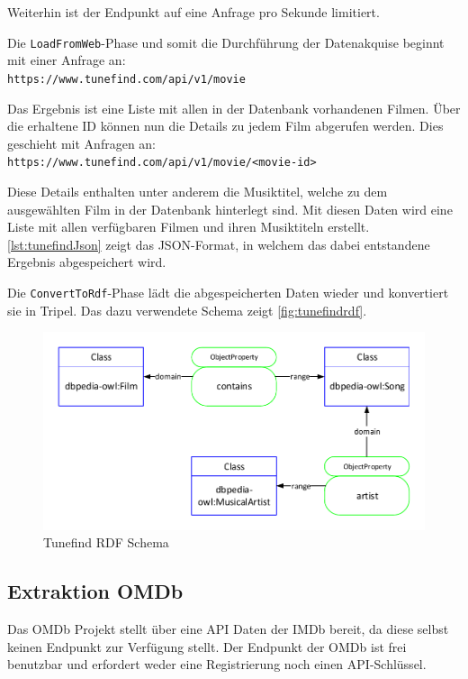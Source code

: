 \documentclass[parskip]{scrartcl}
\begin{document}
Weiterhin ist der Endpunkt auf eine Anfrage pro Sekunde limitiert.

Die \texttt{LoadFromWeb}-Phase und somit die Durchführung der Datenakquise beginnt mit einer Anfrage an:\\
\texttt{https://www.tunefind.com/api/v1/movie}

Das Ergebnis ist eine Liste mit allen in der Datenbank vorhandenen Filmen. Über die erhaltene ID können nun die Details zu jedem Film abgerufen werden. Dies geschieht mit Anfragen an:\\
\texttt{https://www.tunefind.com/api/v1/movie/<movie-id>}

Diese Details enthalten unter anderem die Musiktitel, welche zu dem ausgewählten Film in der Datenbank hinterlegt sind.
Mit diesen Daten wird eine Liste mit allen verfügbaren Filmen und ihren Musiktiteln erstellt. \autoref{lst:tunefindJson} zeigt das JSON-Format, in welchem das dabei entstandene Ergebnis abgespeichert wird.



Die \texttt{ConvertToRdf}-Phase lädt die abgespeicherten Daten wieder und konvertiert sie in Tripel. Das dazu verwendete Schema zeigt \autoref{fig:tunefindrdf}.

\begin{figure}[H]
    \centering
    \caption{Tunefind RDF Schema}
    \label{fig:tunefindrdf}
    \includegraphics[scale=0.8]{tunefind}
\end{figure}
\subsection{Extraktion OMDb}

Das OMDb Projekt stellt über eine API Daten der IMDb bereit, da diese selbst keinen Endpunkt zur Verfügung stellt. Der Endpunkt der OMDb ist frei benutzbar und erfordert weder eine Registrierung noch einen API-Schlüssel.
\end{document}
